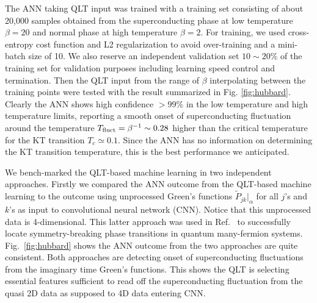 \documentclass[amsmath,amssymb, aps, prx, longbibliography, twocolumn]{revtex4-1}
\begin{document}


The ANN taking QLT input was trained with a training set consisting of about 20,000 samples obtained from the superconducting phase at low temperature $\beta=20$ and normal phase at high temperature $\beta=2$. 
For training, we used cross-entropy cost function and  L2 regularization to avoid over-training and a mini-batch size of 10. We also reserve an independent validation set $10\sim 20\%$ of the training set for validation purposes including learning speed control and termination\cite{MLbook}.
Then the QLT input from the range of $\beta$ interpolating between the training points were tested with the result summarized in Fig. \ref{fig:hubbard}. 
Clearly the ANN shows high confidence  $>99\%$ in the low temperature and high temperature limits, reporting a smooth onset of superconducting fluctuation around the temperature $T_{\rm fluct}=\beta^{-1} \sim 0.28$ higher than the critical temperature for the KT transition $T_c\simeq 0.1$\cite{Scalapino1993}. Since the ANN has no information on determining the KT transition temperature, this is the best performance we anticipated. 

We bench-marked  the QLT-based machine learning in two independent approaches. Firstly we compared the ANN outcome from the QLT-based machine learning to the outcome using unprocessed Green's functions $\widetilde{P}_{jk}|_{\alpha}$ for all $j$'s and $k$'s as input to convolutional neural network (CNN). Notice that this unprocessed data is 4-dimensional. This latter approach was used in Ref.~\cite{Simon2016} to successfully locate symmetry-breaking phase transitions 
in quantum many-fermion systems. Fig.~\ref{fig:hubbard} shows the ANN outcome from the two approaches are quite consistent. Both approaches are detecting onset of superconducting fluctuations from the imaginary time Green's functions. This shows the QLT is selecting essential features sufficient to read off the superconducting fluctuation from the quasi 2D data as supposed to 4D data entering CNN. 
\end{document}
